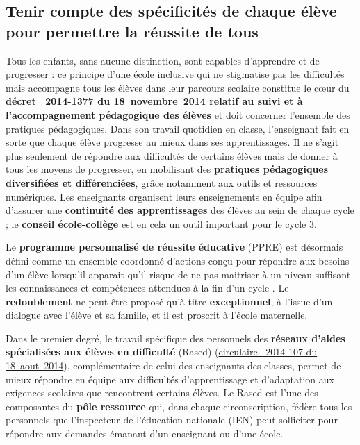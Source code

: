 \subsection{Tenir compte des spécificités de chaque élève pour permettre la réussite de tous} 
Tous les enfants, sans aucune distinction, sont capables d’apprendre et de progresser : ce principe d’une école inclusive qui ne stigmatise pas les difficultés mais accompagne tous les élèves dans leur parcours scolaire constitue le cœur du \textbf{\href{http://www.education.gouv.fr/pid25535/bulletin_officiel.html?cid_bo=84055}{décret \no{}~2014-1377 du 18~novembre~2014} relatif au suivi et à l’accompagnement pédagogique des élèves} et doit concerner l’ensemble des pratiques pédagogiques. Dans son travail quotidien en classe, l’enseignant fait en sorte que chaque élève progresse au mieux dans ses apprentissages. Il ne s’agit plus seulement de répondre aux difficultés de certains élèves mais de donner à tous les moyens de progresser, en mobilisant des \textbf{pratiques pédagogiques diversifiées et différenciées}, grâce notamment aux outils et ressources numériques. Les enseignants organisent leurs enseignements en équipe afin d’assurer une \textbf{continuité des apprentissages} des élèves au sein de chaque cycle ; le \textbf{conseil école-collège} est en cela un outil important pour le cycle 3.

Le \textbf{programme personnalisé de réussite éducative} (PPRE) est désormais défini comme \og un ensemble coordonné d’actions conçu pour répondre aux besoins d’un élève lorsqu’il apparait qu’il risque de ne pas maitriser à un niveau suffisant les connaissances et compétences attendues à la fin d’un cycle \fg{}. Le \textbf{redoublement} ne peut être proposé qu’à titre \textbf{exceptionnel}, à l’issue d’un dialogue avec l’élève et sa famille, et il est proscrit à l’école maternelle.

Dans le premier degré, le travail spécifique des personnels des \textbf{réseaux d’aides spécialisées aux élèves en difficulté} (Rased) (\href{http://www.education.gouv.fr/pid25535/bulletin_officiel.html?cid_bo=81597}{circulaire \no{}~2014-107 du 18~aout~2014}), complémentaire de celui des enseignants des classes, permet de mieux répondre en équipe aux difficultés d’apprentissage et d’adaptation aux exigences scolaires que rencontrent certains élèves. Le Rased est l’une des composantes du \textbf{pôle ressource} qui, dans chaque circonscription, fédère tous les personnels que l’inspecteur de l’éducation nationale (IEN) peut solliciter pour répondre aux demandes émanant d’un enseignant ou d’une école.

